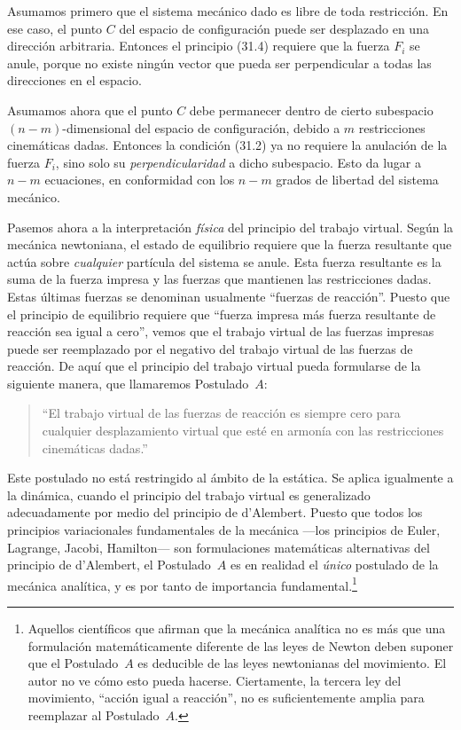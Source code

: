 Asumamos primero que el sistema mecánico dado es libre de toda restricción. En ese caso, el punto $C$ del espacio de configuración puede ser desplazado en una dirección arbitraria. Entonces el principio (31.4) requiere que la fuerza $F_i$ se anule, porque no existe ningún vector que pueda ser perpendicular a todas las direcciones en el espacio.

Asumamos ahora que el punto $C$ debe permanecer dentro de cierto subespacio $(n - m)$-dimensional del espacio de configuración, debido a $m$ restricciones cinemáticas dadas. Entonces la condición (31.2) ya no requiere la anulación de la fuerza $F_i$, sino solo su \emph{perpendicularidad} a dicho subespacio. Esto da lugar a $n - m$ ecuaciones, en conformidad con los $n - m$ grados de libertad del sistema mecánico.

Pasemos ahora a la interpretación \emph{física} del principio del trabajo virtual. Según la mecánica newtoniana, el estado de equilibrio requiere que la fuerza resultante que actúa sobre \emph{cualquier} partícula del sistema se anule. Esta fuerza resultante es la suma de la fuerza impresa y las fuerzas que mantienen las restricciones dadas. Estas últimas fuerzas se denominan usualmente ``fuerzas de reacción''. Puesto que el principio de equilibrio requiere que ``fuerza impresa más fuerza resultante de reacción sea igual a cero'', vemos que el trabajo virtual de las fuerzas impresas puede ser reemplazado por el negativo del trabajo virtual de las fuerzas de reacción. De aquí que el principio del trabajo virtual pueda formularse de la siguiente manera, que llamaremos Postulado~$A$:

\begin{quote}
``El trabajo virtual de las fuerzas de reacción es siempre cero para cualquier desplazamiento virtual que esté en armonía con las restricciones cinemáticas dadas.''
\end{quote}

Este postulado no está restringido al ámbito de la estática. Se aplica igualmente a la dinámica, cuando el principio del trabajo virtual es generalizado adecuadamente por medio del principio de d'Alembert. Puesto que todos los principios variacionales fundamentales de la mecánica ---los principios de Euler, Lagrange, Jacobi, Hamilton--- son formulaciones matemáticas alternativas del principio de d'Alembert, el Postulado~$A$ es en realidad el \emph{único} postulado de la mecánica analítica, y es por tanto de importancia fundamental.\footnote{Aquellos científicos que afirman que la mecánica analítica no es más que una formulación matemáticamente diferente de las leyes de Newton deben suponer que el Postulado~$A$ es deducible de las leyes newtonianas del movimiento. El autor no ve cómo esto pueda hacerse. Ciertamente, la tercera ley del movimiento, ``acción igual a reacción'', no es suficientemente amplia para reemplazar al Postulado~$A$.}

